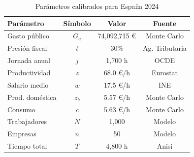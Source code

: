 \begin{table}[h]
\centering
\caption{Parámetros calibrados para España 2024}
\begin{tabular}{lccc}
\toprule
\textbf{Parámetro} & \textbf{Símbolo} & \textbf{Valor} & \textbf{Fuente} \\
\midrule
Gasto público & $G_a$ & 74,092,715 € & Monte Carlo \\
Presión fiscal & $t$ & 30\% & Ag. Tributaria \\
Jornada anual & $j$ & 1,700 h & OCDE \\
Productividad & $z$ & 68.0 €/h & Eurostat \\
Salario medio & $w$ & 17.5 €/h & INE \\
Prod. doméstica & $z_b$ & 5.57 €/h & Monte Carlo \\
Consumo & $c$ & 5.63 €/h & Monte Carlo \\
Trabajadores & $N$ & 1,000 & Modelo \\
Empresas & $n$ & 50 & Modelo \\
Tiempo total & $T$ & 4,800 h & Anisi \\
\bottomrule
\end{tabular}
\end{table}
